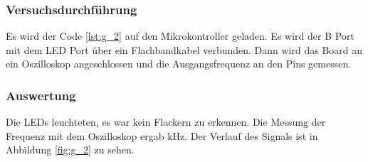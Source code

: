 \documentclass[12pt,a4paper]{article}
\begin{document}
\subsubsection*{Versuchsdurchführung}

Es wird der Code \ref{lst:g_2} auf den Mikrokontroller geladen. Es wird der B Port mit dem LED Port über ein Flachbandkabel verbunden. Dann wird das Board an ein Oszilloskop angeschlossen und die Ausgangsfrequenz an den Pins gemessen.

\subsubsection*{Auswertung}

Die LEDs leuchteten, es war kein Flackern zu erkennen. Die Messung der Frequenz mit dem Oszilloskop ergab \unit[28,9]{kHz}. Der Verlauf des Signals ist in Abbildung \ref{fig:g_2} zu sehen.
\end{document}

